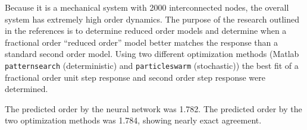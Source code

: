 Because it is a mechanical system with 2000 interconnected nodes, the overall
system has extremely high order dynamics. The purpose of the research outlined
in the references is to determine reduced order models and determine when a
fractional order ``reduced order'' model better matches the response than a
standard second order model. Using two different optimization methods (Matlab
\texttt{patternsearch} (deterministic) and \texttt{particleswarm} (stochastic))
the best fit of a fractional order unit step response and second order step
response were determined.

The predicted order by the neural network was 1.782. The predicted order by the
two optimization methods was 1.784, showing nearly exact agreement.
